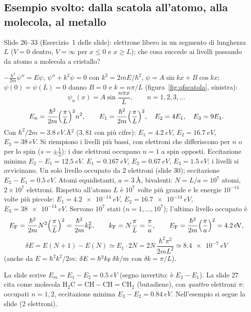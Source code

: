 \documentclass[11pt,a4paper]{article}
\begin{document}
\subsection{Esempio svolto: dalla scatola all'atomo, alla molecola, al metallo}\label{sec:scatola}
Slide 26--33 (Esercizio~1 delle slide): elettrone libero in un segmento di lunghezza $L$ ($V=0$ dentro, $V=\infty$ per $x\le0$ e $x\ge L$); che cosa succede ai livelli passando da atomo a molecola a cristallo?
\begin{esempio}
$-\frac{\hbar^2}{2m}\psi''=E\psi$, $\psi''+k^2\psi=0$ con $k^2=2mE/\hbar^2$, $\psi=A\sin kx+B\cos kx$; $\psi(0)=\psi(L)=0$ danno $B=0$ e $k=n\pi/L$ (figura~\ref{fig:qfscatola}, sinistra):
\[
\psi_n(x)=A\sin\frac{n\pi x}L,\qquad n=1,2,3,\dots
\]
\[
E_n=\frac{\hbar^2}{2m}\Bigl(\frac\pi L\Bigr)^2n^2,\qquad E_1=\frac{\hbar^2}{2m}\Bigl(\frac\pi L\Bigr)^2,\quad E_2=4E_1,\quad E_3=9E_1 .
\]
Con $\hbar^2/2m=\SI{3,8}{eV.\angstrom^2}$ ($3{,}81$ con più cifre): $E_1=\SI{4,2}{eV}$, $E_2=\SI{16,7}{eV}$, $E_3=\SI{38}{eV}$. Si riempiono i livelli più bassi,
con elettroni che differiscono per $n$ o per lo spin ($s=\pm\frac12$): i due elettroni occupano $n=1$ a spin opposti. Eccitazione minima $E_2-E_1=\SI{12,5}{eV}$.
$E_1=\SI{0,167}{eV}$, $E_2=\SI{0,67}{eV}$, $E_3=\SI{1,5}{eV}$: i livelli si avvicinano. Un solo livello occupato da 2 elettroni (slide 30); eccitazione $E_2-E_1=\SI{0,5}{eV}$.
Atomi equidistanti, $a=\SI{3}{\angstrom}$, bivalenti: $N=L/a=10^7$ atomi, $2\times10^7$ elettroni. Rispetto all'atomo $L$ è $10^7$ volte più grande e le energie $10^{-14}$ volte
più piccole: $E_1=\SI{4,2e-14}{eV}$, $E_2=\SI{16,7e-14}{eV}$, $E_3=\SI{38e-14}{eV}$. Servono $10^7$ stati ($n=1,\dots,10^7$); l'ultimo livello occupato è
\[
E_{\mathrm F}=\frac{\hbar^2}{2m}N^2\Bigl(\frac\pi L\Bigr)^2=\frac{\hbar^2}{2m}k_{\mathrm F}^2,\qquad k_{\mathrm F}=N\frac\pi L=\frac\pi a,\qquad E_{\mathrm F}=\frac{\hbar^2}{2m}\Bigl(\frac\pi a\Bigr)^2=\SI{4,2}{eV},
\]
\[
\delta E=E(N+1)-E(N)\simeq E_1\cdot2N=2N\,\frac{\hbar^2\pi^2}{2mL^2}\simeq\SI{8,4e-7}{eV}
\]
(anche da $E=\hbar^2k^2/2m$: $\delta E=\hbar^2k_{\mathrm F}\,\delta k/m$ con $\delta k=\pi/L$).
\end{esempio}

\begin{osservazione}
La slide scrive $E_m=E_1-E_2=\SI{0,5}{eV}$ (segno invertito: è $E_2-E_1$). La slide 27 cita come molecola $\mathrm{H_2C{=}CH{-}CH{=}CH_2}$ (butadiene), con \emph{quattro}
elettroni $\pi$: occupati $n=1,2$, eccitazione minima $E_3-E_2=\SI{0,84}{eV}$. Nell'esempio si segue la slide (2 elettroni).
\end{osservazione}
\end{document}
